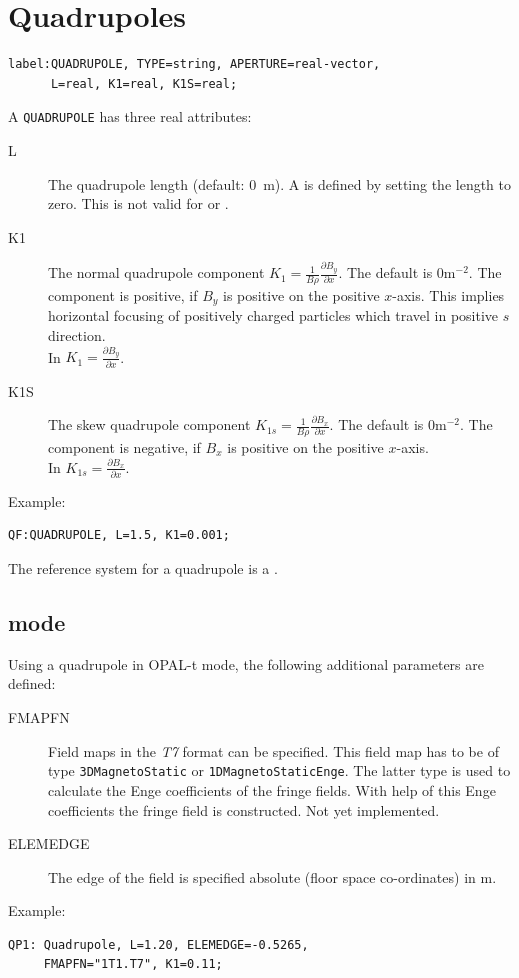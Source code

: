 \section{Quadrupoles}
\label{sec:quadrupole}
\begin{verbatim}
label:QUADRUPOLE, TYPE=string, APERTURE=real-vector,
      L=real, K1=real, K1S=real;
\end{verbatim}
A \texttt{QUADRUPOLE} has three real attributes:
\begin{description}
\item[L]
  The quadrupole length (default: 0~m).
  A  is defined by setting the length to zero. This is not valid for \opalt or \opalcycl.
\item[K1]
  The normal quadrupole component
  $K_1=\frac{1}{B \rho}\frac{\partial B_y}{\partial x}$.
  The default is $0 \mathrm{m}^{-2}$.
  The component is positive, if $B_y$ is positive on the positive $x$-axis.
  This implies horizontal focusing of positively charged particles which
  travel in positive $s$ direction.\\
  In \opalt $K_1=\frac{\partial B_y}{\partial x}$.
\item[K1S]
  The skew quadrupole component
  $K_{1s}=\frac{1}{B \rho}\frac{\partial B_x}{\partial x}$.
  The default is $0 \mathrm{m}^{-2}$.
  The component is negative, if $B_x$ is positive on the positive $x$-axis.\\
In \opalt $K_{1s}=\frac{\partial B_x}{\partial x}$.
\end{description}
\noindent Example:
\begin{verbatim}
QF:QUADRUPOLE, L=1.5, K1=0.001;
\end{verbatim}
The reference system for a quadrupole is a 
.

\subsection{\opalt mode}
\label{sec:quadrupole-t}
Using a quadrupole in OPAL-t mode, the following additional parameters are defined:
\begin{description}
\item[FMAPFN]
  Field maps in the {\em T7} format can be specified. This field map has to be of type \texttt{3DMagnetoStatic}
  or \texttt{1DMagnetoStaticEnge}. The latter type is used to calculate the Enge coefficients of the fringe fields.
  With help of this Enge coefficients the fringe field is constructed. Not yet implemented.
\item[ELEMEDGE]
  The edge of the field is specified absolute (floor space co-ordinates) in m.
  \end{description}
\noindent Example:
\begin{verbatim}
QP1: Quadrupole, L=1.20, ELEMEDGE=-0.5265, 
     FMAPFN="1T1.T7", K1=0.11;
\end{verbatim}


